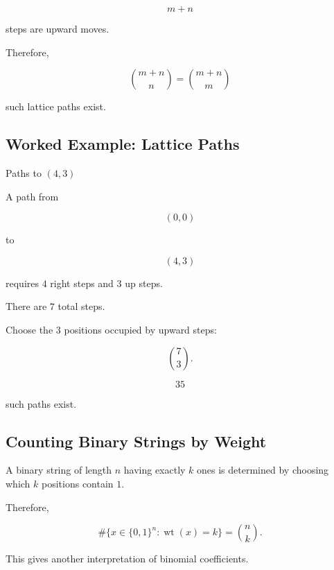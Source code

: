 \[
m+n
\]

steps are upward moves.

Therefore,

\[
\boxed{
\binom{m+n}{n}
=
\binom{m+n}{m}
}
\]

such lattice paths exist.

\subsection{Worked Example: Lattice Paths}
\label{subsec:worked-lattice-path}

\begin{workedexamplebox}{Paths to \((4,3)\)}

A path from

\[
(0,0)
\]

to

\[
(4,3)
\]

requires \(4\) right steps and \(3\) up steps.

There are \(7\) total steps.

Choose the \(3\) positions occupied by upward steps:

\[
\binom73.
\]

\begin{answerbox}
\[
\boxed{
35
}
\]

such paths exist.
\end{answerbox}

\end{workedexamplebox}

\subsection{Counting Binary Strings by Weight}
\label{subsec:binary-strings-by-weight}

A binary string of length \(n\) having exactly \(k\) ones is determined
by choosing which \(k\) positions contain \(1\).

Therefore,

\[
\boxed{
\#\{x\in\{0,1\}^n:\operatorname{wt}(x)=k\}
=
\binom{n}{k}.
}
\]

This gives another interpretation of binomial coefficients.

